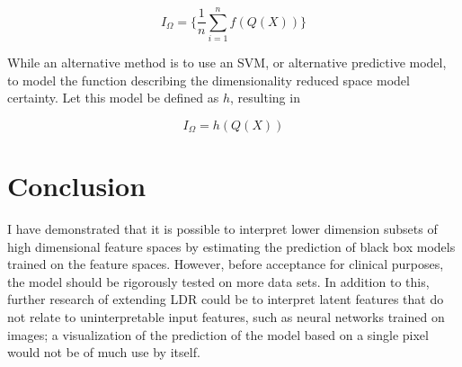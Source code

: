\documentclass[a4paper, twocolumn]{article}
\begin{document}
$$I_\Omega = \{\frac{1}{n} \sum^n_{i=1} f(Q(X))\}$$

While an alternative method is to use an SVM, or alternative predictive model, to model the function describing the dimensionality reduced space model certainty. Let this model be defined as $h$, resulting in

$$I_\Omega = h(Q(X))$$

\section{Conclusion}\label{Conclusion}

I have demonstrated that it is possible to interpret lower dimension subsets of high dimensional feature spaces by estimating the prediction of black box models trained on the feature spaces. However, before acceptance for clinical purposes, the model should be rigorously tested on more data sets. In addition to this, further research of extending LDR could be to interpret latent features that do not relate to uninterpretable input features, such as neural networks trained on images; a visualization of the prediction of the model based on a single pixel would not be of much use by itself.

\printbibliography
\end{document}
